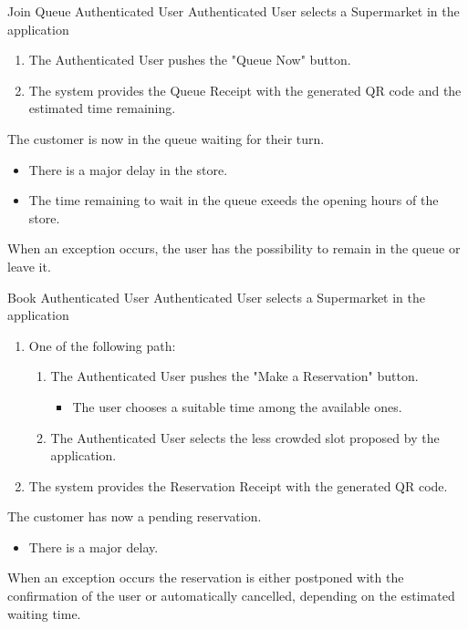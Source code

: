 \usecase
{Join Queue}
{Authenticated User}
{Authenticated User selects a Supermarket in the application}
{
        \begin{enumerate}
            \item The Authenticated User pushes the "Queue Now" button.
            \item The system provides the Queue Receipt with the generated QR code and the estimated time remaining.
        \end{enumerate}
}
{
    The customer is now in the queue waiting for their turn.
}
{
    \begin{itemize}
        \item There is a major delay in the store. 
        \item The time remaining to wait in the queue exeeds the opening hours of the store. 
    \end{itemize}
}
{
    When an exception occurs, the user has the possibility to remain in the queue or leave it. 
}


\usecase
{Book}
{Authenticated User}
{Authenticated User selects a Supermarket in the application}
{
        \begin{enumerate}
            \item One of the following path:  
            \begin{enumerate}
                \item The Authenticated User pushes the "Make a Reservation" button.
                \begin{itemize}
                    \item The user chooses a suitable time among the available ones.
                \end{itemize}
                \item The Authenticated User selects the less crowded slot proposed by the application.
            \end{enumerate}
            \item The system provides the Reservation Receipt with the generated QR code.
        \end{enumerate}
}
{
    The customer has now a pending reservation.
}
{
    \begin{itemize}
        \item There is a major delay.
    \end{itemize}
}
{
    When an exception occurs the reservation is either postponed with the confirmation of the user or automatically cancelled, depending on the estimated waiting time. 
}


